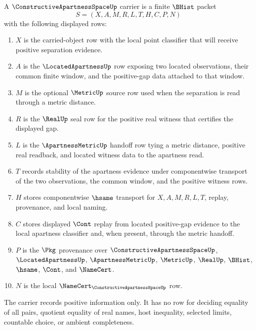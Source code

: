 \begin{definition}
\label{def:constructive-apartness-space-carrier}
A $\ConstructiveApartnessSpaceUp$ carrier is a finite $\BHist$ packet
$$
S=(X,A,M,R,L,T,H,C,P,N)
$$
with the following displayed rows:
\begin{enumerate}
\item $X$ is the carried-object row with the local point classifier that will receive positive separation evidence.
\item $A$ is the $\LocatedApartnessUp$ row exposing two located observations, their common finite window, and the positive-gap data attached to that window.
\item $M$ is the optional $\MetricUp$ source row used when the separation is read through a metric distance.
\item $R$ is the $\RealUp$ seal row for the positive real witness that certifies the displayed gap.
\item $L$ is the $\ApartnessMetricUp$ handoff row tying a metric distance, positive real readback, and located witness data to the apartness read.
\item $T$ records stability of the apartness evidence under componentwise transport of the two observations, the common window, and the positive witness rows.
\item $H$ stores componentwise $\hsame$ transport for $X,A,M,R,L,T$, replay, provenance, and local naming.
\item $C$ stores displayed $\Cont$ replay from located positive-gap evidence to the local apartness classifier and, when present, through the metric handoff.
\item $P$ is the $\Pkg$ provenance over $\ConstructiveApartnessSpaceUp$, $\LocatedApartnessUp$, $\ApartnessMetricUp$, $\MetricUp$, $\RealUp$, $\BHist$, $\hsame$, $\Cont$, and $\NameCert$.
\item $N$ is the local $\NameCert_{\ConstructiveApartnessSpaceUp}$ row.
\end{enumerate}
The carrier records positive information only. It has no row for deciding equality of all pairs, quotient equality of real names, host inequality, selected limits, countable choice, or ambient completeness.
\end{definition}

